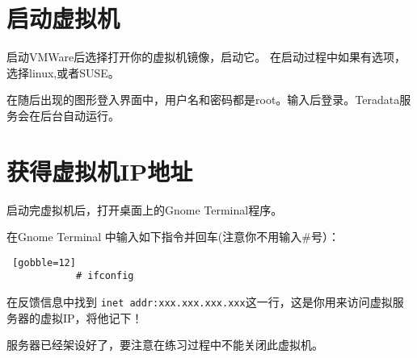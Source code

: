 \documentclass{article}
\begin{document}

	\section{启动虚拟机} %
		
		启动VMWare后选择打开你的虚拟机镜像，启动它。
		在启动过程中如果有选项，选择linux,或者SUSE。

		在随后出现的图形登入界面中，用户名和密码都是root。输入后登录。Teradata服务会在后台自动运行。

	\section{获得虚拟机IP地址} %
	
		
		
		启动完虚拟机后，打开桌面上的Gnome Terminal程序。

		在Gnome Terminal 中输入如下指令并回车(注意你不用输入\#号）：

		\begin{lstlisting} [gobble=12]
			# ifconfig
		\end{lstlisting}

		在反馈信息中找到 \lstinline|inet addr:xxx.xxx.xxx.xxx|这一行，这是你用来访问虚拟服务器的虚拟IP，将他记下！ 

		

		服务器已经架设好了，要注意在练习过程中不能关闭此虚拟机。



\end{document}
